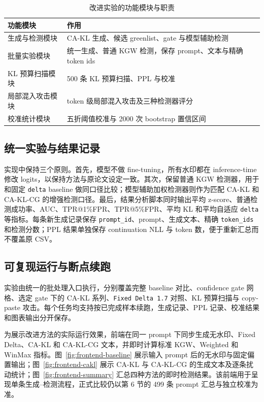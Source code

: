 \documentclass[a4paper,UTF8,zihao=5]{ctexart}
\newcommand{\method}{CA-KL}
\newcommand{\fullmethod}{CA-KL-CG}
\begin{document}
\begin{table}[H]
    \centering
    \caption{改进实验的功能模块与职责}
    \label{tab:code-structure}
    \small
    \begin{tabularx}{\textwidth}{p{}X}
        \toprule
        功能模块      & 作用                                       \\
        \midrule
        生成与检测模块   & CA-KL 生成、候选 greenlist、gate 与模型辅助检测       \\
        批量实验模块    & 统一生成、普通 KGW 检测，保存 prompt、文本与精确 token ids \\
        KL 预算扫描模块 & 500 条 KL 预算扫描、PPL 与校准                    \\
        局部混入攻击模块  & token 级局部混入攻击及三种检测器评分                    \\
        校准统计模块    & 五折阈值校准与 2000 次 bootstrap 置信区间            \\
        \bottomrule
    \end{tabularx}
\end{table}

\subsection{统一实验与结果记录}

实现中保持三个原则。首先，模型不做 fine-tuning，所有水印都在 inference-time 修改 logits，以保持方法与原论文设定一致。其次，保留普通 KGW 检测器，用于和固定 \texttt{delta} baseline 做同口径比较；模型辅助加权检测器则作为匹配 \method{} 和 \fullmethod{} 的增强检测口径。最后，结果分析脚本同时输出平均 z-score、普通检测成功率、AUC、TPR@1\%FPR、TPR@5\%FPR、平均 KL 和平均自适应 \texttt{delta} 等指标。每条新生成记录保存 \texttt{prompt\_id}、prompt、生成文本、精确 \texttt{token\_ids} 和检测分数；PPL 结果单独保存 continuation NLL 与 token 数，便于重新汇总而不覆盖原 CSV。

\subsection{可复现运行与断点续跑}

实验由统一的批处理入口执行，分别覆盖完整 baseline 对比、confidence gate 网格、选定 gate 下的 \method{} 系列、\texttt{Fixed Delta 1.7} 对照、KL 预算扫描与 copy-paste 攻击。每个任务均支持按已完成样本续跑，生成记录、PPL 记录、校准结果和图表输出分开保存。

为展示改进方法的实际运行效果，前端在同一 prompt 下同步生成无水印、Fixed Delta、\method{} 和 \fullmethod{} 文本，并即时计算标准 KGW、Weighted 和 WinMax 指标。图~\ref{fig:frontend-baseline} 展示输入 prompt 后的无水印与固定偏置输出；图~\ref{fig:frontend-cakl} 展示 \method{} 与 \fullmethod{} 的生成文本及逐条扰动统计；图~\ref{fig:frontend-summary} 汇总四种方法的即时检测结果。该前端用于呈现单条生成--检测流程，正式比较仍以第 6 节的 499 条 prompt 汇总与独立校准为准。
\end{document}
